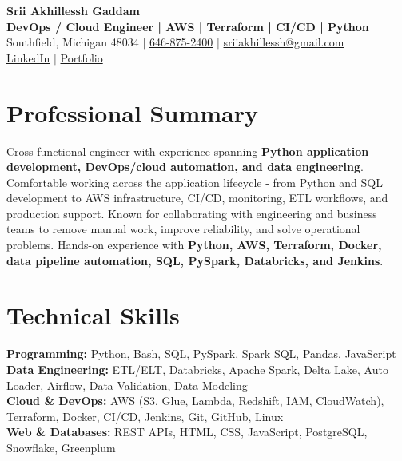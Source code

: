 \documentclass[letterpaper,10pt]{article}
\begin{document}
\fontsize{9.35pt}{10.45pt}\selectfont

\begin{center}
    {\LARGE \textbf{Srii Akhillessh Gaddam}} \\[-1pt]
    \textbf{DevOps / Cloud Engineer | AWS | Terraform | CI/CD | Python} \\[2pt]
    Southfield, Michigan 48034 $|$
    \href{tel:6468752400}{646-875-2400} $|$
    \href{mailto:sriiakhillessh@gmail.com}{sriiakhillessh@gmail.com} \\[1pt]
    \href{https://www.linkedin.com/in/srii-akhiilessh-gaddam-b48668191/}{LinkedIn} $|$
    \href{https://sriiakhillesshg.github.io/portfolio/}{Portfolio}
\end{center}
\vspace{-8pt}

\section{Professional Summary}
\small{Cross-functional engineer with experience spanning \textbf{Python application development, DevOps/cloud automation, and data engineering}. Comfortable working across the application lifecycle - from Python and SQL development to AWS infrastructure, CI/CD, monitoring, ETL workflows, and production support. Known for collaborating with engineering and business teams to remove manual work, improve reliability, and solve operational problems. Hands-on experience with \textbf{Python, AWS, Terraform, Docker, data pipeline automation, SQL, PySpark, Databricks, and Jenkins}.}

\section{Technical Skills}
\small{
\textbf{Programming:} Python, Bash, SQL, PySpark, Spark SQL, Pandas, JavaScript \\
\textbf{Data Engineering:} ETL/ELT, Databricks, Apache Spark, Delta Lake, Auto Loader, Airflow, Data Validation, Data Modeling \\
\textbf{Cloud \& DevOps:} AWS (S3, Glue, Lambda, Redshift, IAM, CloudWatch), Terraform, Docker, CI/CD, Jenkins, Git, GitHub, Linux \\
\textbf{Web \& Databases:} REST APIs, HTML, CSS, JavaScript, PostgreSQL, Snowflake, Greenplum
}
\end{document}
